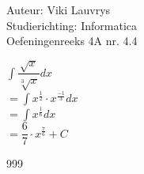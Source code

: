 \documentclass[a4paper]{article}
\begin{document}
  
\noindent \large Auteur: Viki	Lauvrys \\
\noindent \large Studierichting: Informatica\\
\noindent \large Oefeningenreeks 4A nr. 4.4\\

\medskip

\normalsize

$\displaystyle\int \dfrac{\sqrt{x}}{\sqrt[3]{x}} dx $ \\

$ = \displaystyle\int x^{\tfrac{1}{2}} \cdot x^{\tfrac{-1}{3}} dx $ \\

$ = \displaystyle\int x^{\tfrac{1}{6}} dx $ \\

$ = \dfrac{6}{7} \cdot x^{\tfrac{7}{6}} + C $ \\

\begin{thebibliography}{999}
\end{thebibliography}
\end{document}
